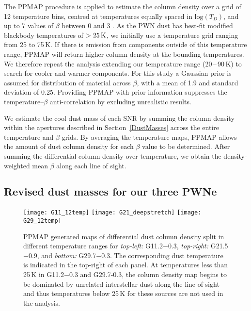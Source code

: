 \documentclass[fleqn,usenatbib]{mnras}
\begin{document}
{%
The PPMAP procedure is applied to estimate the column density over a grid of 12 temperature bins, centred at temperatures equally spaced in $\mathrm{log}(T_D)$, and up to 7 values of $\beta$ between 0 and 3 \citep{Marsh2015}. As the PWN dust has best-fit modified blackbody temperatures of $>25\,\rm K$, we initially use a temperature grid ranging from 25 to 75\,K. If there is emission from components outside of this temperature range, PPMAP will return higher column density at the bounding temperatures. We therefore repeat the analysis extending our temperature range (20\,--\,90\,K) to search for cooler and warmer components. %
For this study a Gaussian prior is assumed for distribution of material across $\beta$, with a mean of 1.9 \citep{Planck2016beta} and standard deviation of 0.25.
Providing PPMAP with prior information suppresses the temperature--$\beta$ anti-correlation by excluding unrealistic results.

We estimate the cool dust mass of each SNR by summing the column density within the apertures described in Section~\ref{DustMasses} across the entire temperature and $\beta$ grids. By averaging the temperature maps, PPMAP allows the amount of dust column density for each $\beta$ value to be determined.
After summing the differential column density over temperature, we obtain the density-weighted mean $\beta$ along each line of sight.


\subsection{Revised dust masses for our three PWNe} \label{ppmapResults}

\begin{figure*}
	\texttt{[image: G11\_12temp]}
	\texttt{[image: G21\_deepstretch]}
	\texttt{[image: G29\_12temp]}
	\caption{PPMAP generated maps of differential dust column density split in different temperature ranges for \textit{top-left:} G11.2$-$0.3, \textit{top-right:} G21.5$-$0.9, and \textit{bottom:} G29.7$-$0.3. The corresponding dust temperature is indicated in the top-right of each panel. At temperatures less than 25\,K in G11.2$-$0.3 and G29.7-0.3, the column density map begins to be dominated by unrelated interstellar dust along the line of sight and thus temperatures below 25\,K for these sources are not used in the analysis.}
	\label{fig:G11_temps}
\end{figure*}

}
\end{document}
